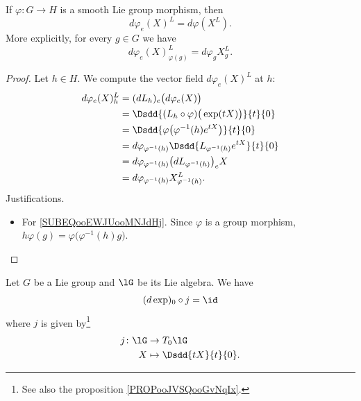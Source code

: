\begin{lemma}           \label{LEMooKSTKooNCnxzB}
	If \( \varphi\colon G\to H\) is a smooth Lie group morphism, then
	\begin{equation}
		d\varphi_e(X)^L=d\varphi(X^L).
	\end{equation}
	More explicitly, for every \( g\in G\) we have
	\begin{equation}
		d\varphi_e(X)^L_{\varphi(g)}=d\varphi_gX^L_g.
	\end{equation}
\end{lemma}

\begin{proof}
	Let \( h\in H\). We compute the vector field \( d\varphi_e(X)^L\) at \( h\):
	\begin{subequations}
		\begin{align}
			d\varphi_e(X)^L_h & =(dL_h)_e\big( d\varphi_e(X) \big)                                                     \\
			                  & =\Dsdd{ (L_h\circ\varphi)\big( \exp(tX) \big) }{t}{0}                                  \\
			                  & =\Dsdd{ \varphi\big( \varphi^{-1}(h) e^{tX} \big) }{t}{0}  \label{SUBEQooEWJUooMNJdHj} \\
			                  & =d\varphi_{\varphi^{-1}(h)}\Dsdd{ L_{\varphi^{-1}(h)} e^{tX} }{t}{0}                   \\
			                  & =d\varphi_{\varphi^{-1}(h)}\big( dL_{\varphi^{-1}(h)} \big)_eX                         \\
			                  & =d\varphi_{\varphi^{-1}(h)}X^L_{\varphi^{-1}(h)}.
		\end{align}
	\end{subequations}
	Justifications.
	\begin{itemize}
		\item For \eqref{SUBEQooEWJUooMNJdHj}. Since \( \varphi\) is a group morphism, \( h\varphi(g)=\varphi\big( \varphi^{-1}(h)g \big)\).
	\end{itemize}
\end{proof}

\begin{lemma}     \label{LEMooHQYMooJjdKkG}
	Let \( G\) be a Lie group and \( \lG\) be its Lie algebra. We have
	\begin{equation}
		(d\exp)_0\circ j=\id
	\end{equation}
	where \( j\) is given by\footnote{See also the proposition \ref{PROPooJVSQooGvNqIx}.}
	\begin{equation}
		\begin{aligned}
			j\colon \lG & \to T_0\lG                 \\
			X           & \mapsto \Dsdd{ tX }{t}{0}.
		\end{aligned}
	\end{equation}
\end{lemma}

